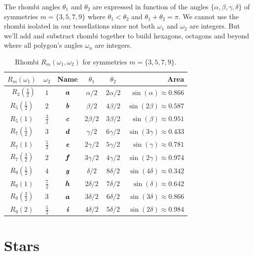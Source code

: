 \documentclass[11pt]{article}
\def\mathbi#1{\textbf{\em #1}}
\begin{document}
The rhombi angles $\theta_1$ and $\theta_2$ are expressed in function of the angles $\{\alpha,\beta,\gamma,\delta\}$ of symmetries $m=\{3,5,7,9\}$ where $\theta_1 < \theta_2$ and $\theta_1 + \theta_2 = \pi$. We cannot use the rhombi isolated in our tessellations since not both $\omega_1$ and $\omega_2$ are integers. But we'll add and substract rhombi together to build hexagons, octagons and beyond where all polygon's angles $\omega_n$ are integers.

\begin{table}[h]
\begin{center}
\begin{tabular}{|c|c|c|c c| r |}
\hline
$R_m(\omega_1)$ & $\omega_2$ & Name & $\theta_1$ & $\theta_2$ & Area \\ \hline\
$R_3(\frac{1}2)$ & $1$  & $\mathbi{a}$ & $\alpha/2$ & $2\alpha/2$  & $\sin(\alpha) \approx 0.866$ \\[0.5ex]
\hline
$R_5(\frac{1}2)$ & $2$  & $\mathbi{b}$ & $\beta/2$  & $4\beta/2$   & $\sin(2\beta) \approx 0.587$\\[0.5ex]
$R_5(1)$ & $\frac{3}2$  & $\mathbi{c}$ & $2\beta/2$ & $3\beta/2$   & $\sin(\beta) \approx 0.951$\\[0.5ex]
\hline
$R_7(\frac{1}2)$ & $3$  & $\mathbi{d}$ & $\gamma/2$ & $6\gamma/2$  & $\sin(3\gamma) \approx 0.433$\\[0.5ex]
$R_7(1)$ & $\frac{5}2$ & $\mathbi{e}$ & $2\gamma/2$ & $5\gamma/2$ & $\sin(\gamma) \approx 0.781$\\[0.5ex]
$R_7(\frac{3}2)$ & $2$  & $\mathbi{f}$ & $3\gamma/2$ & $4\gamma/2$ & $\sin(2\gamma) \approx 0.974$\\[0.5ex]
\hline
$R_9(\frac{1}2)$ & $4$ & $\mathbi{g}$ & $\delta/2$ & $8\delta/2$  & $\sin(4\delta) \approx 0.342$\\[0.5ex]
$R_9(1)$ & $\frac{7}2$ & $\mathbi{h}$ & $2\delta/2$ & $7\delta/2$ & $\sin(\delta) \approx 0.642$\\[0.5ex]
$R_9(\frac{3}2)$ & $3$ & $\mathbi{a}$ & $3\delta/2$ & $6\delta/2$ & $\sin(3\delta) \approx 0.866$\\[0.5ex]
$R_9(2)$ & $\frac{5}2$ & $\mathbi{i}$ & $4\delta/2$ & $5\delta/2$ & $\sin(2\delta) \approx 0.984$\\[0.5ex]
\hline
\end{tabular}
\caption{Rhombi $R_m(\omega_1,\omega_2)$ for symmetries $m=\{3,5,7,9\}$.} 
\label{tbl:rhombi}
\end{center}
\end{table}

\section{Stars}
\end{document}
